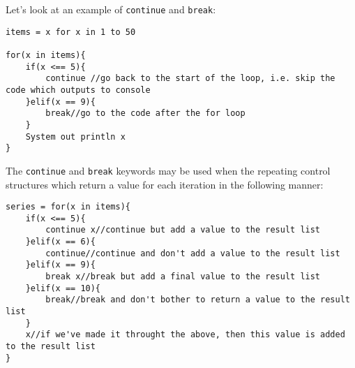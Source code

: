 \documentclass[conc-doc]{subfiles}
\begin{document}
Let's look at an example of \lstinline{continue} and \lstinline{break}:
\begin{lstlisting}
items = x for x in 1 to 50

for(x in items){
	if(x <== 5){
		continue //go back to the start of the loop, i.e. skip the code which outputs to console
	}elif(x == 9){
		break//go to the code after the for loop
	}
	System out println x
}
\end{lstlisting}

The \lstinline{continue} and \lstinline{break} keywords may be used when the repeating control structures which return a value for each iteration in the following manner:

\begin{lstlisting}
series = for(x in items){
	if(x <== 5){
		continue x//continue but add a value to the result list
	}elif(x == 6){
		continue//continue and don't add a value to the result list
	}elif(x == 9){
		break x//break but add a final value to the result list
	}elif(x == 10){
		break//break and don't bother to return a value to the result list
	}
	x//if we've made it throught the above, then this value is added to the result list
}
\end{lstlisting}
\end{document}

